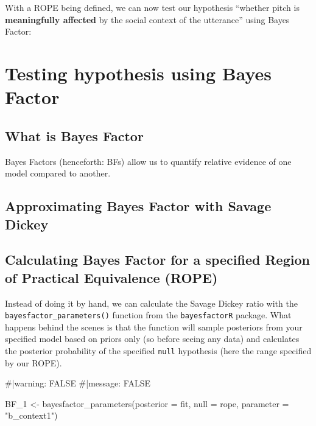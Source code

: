 \documentclass[
  doc,
  floatsintext,
  longtable,
  nolmodern,
  notxfonts,
  notimes,
  colorlinks=true,linkcolor=blue,citecolor=blue,urlcolor=blue]{apa7}
\newenvironment{Shaded}{\begin{snugshade}}{\end{snugshade}}
\newcommand{\AttributeTok}[1]{\textcolor[rgb]{0.40,0.45,0.13}{#1}}
\newcommand{\CommentTok}[1]{\textcolor[rgb]{0.37,0.37,0.37}{#1}}
\newcommand{\FunctionTok}[1]{\textcolor[rgb]{0.28,0.35,0.67}{#1}}
\newcommand{\NormalTok}[1]{\textcolor[rgb]{0.00,0.23,0.31}{#1}}
\newcommand{\OtherTok}[1]{\textcolor[rgb]{0.00,0.23,0.31}{#1}}
\newcommand{\StringTok}[1]{\textcolor[rgb]{0.13,0.47,0.30}{#1}}
\begin{document}
With a ROPE being defined, we can now test our hypothesis ``whether
pitch is \textbf{meaningfully affected} by the social context of the
utterance'' using Bayes Factor:

\section{Testing hypothesis using Bayes
Factor}\label{testing-hypothesis-using-bayes-factor}

\subsection{What is Bayes Factor}\label{what-is-bayes-factor}

Bayes Factors (henceforth: BFs) allow us to quantify relative evidence
of one model compared to another.

\subsection{Approximating Bayes Factor with Savage
Dickey}\label{approximating-bayes-factor-with-savage-dickey}

\subsection{Calculating Bayes Factor for a specified Region of Practical
Equivalence
(ROPE)}\label{calculating-bayes-factor-for-a-specified-region-of-practical-equivalence-rope}

Instead of doing it by hand, we can calculate the Savage Dickey ratio
with the \texttt{bayesfactor\_parameters()} function from the
\texttt{bayesfactorR} package. What happens behind the scenes is that
the function will sample posteriors from your specified model based on
priors only (so before seeing any data) and calculates the posterior
probability of the specified \texttt{null} hypothesis (here the range
specified by our ROPE).

\begin{Shaded}
\begin{Highlighting}[]
\CommentTok{\#|warning: FALSE}
\CommentTok{\#|message: FALSE}

\NormalTok{BF\_1 }\OtherTok{\textless{}{-}} \FunctionTok{bayesfactor\_parameters}\NormalTok{(}\AttributeTok{posterior =}\NormalTok{ fit, }
                               \AttributeTok{null =}\NormalTok{ rope, }
                               \AttributeTok{parameter =} \StringTok{"b\_context1"}\NormalTok{)}
\end{Highlighting}
\end{Shaded}
\end{document}
